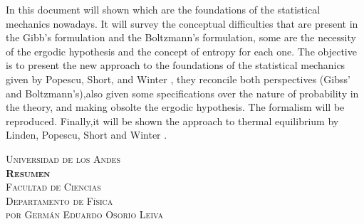\documentclass[11pt]{book}
\theoremstyle{definition}
\begin{document}
\vspace*{4em}
In this document will shown which are the foundations of the statistical mechanics nowadays. It will survey the conceptual difficulties that are present in the Gibb's formulation and the Boltzmann's formulation, some are the necessity of the ergodic hypothesis and the concept of entropy for each one. The objective is to present the new approach to the foundations of the statistical mechanics given by Popescu, Short, and Winter \cite{Popescu2006}, they reconcile both perspectives (Gibss' and Boltzmann's),also given some specifications over the nature of probability in the theory, and making obsolte the ergodic hypothesis. The formalism will be reproduced. Finally,it will be shown the approach to thermal equilibrium by Linden, Popescu, Short and Winter \cite{LindenPaper}.



\newpage

\begin{center}
\vspace*{5em}
\textsc{\normalsize Universidad de los Andes}\\[1em]

\textsc{\large \textbf{Resumen}}\\[1em]

\textsc{\normalsize Facultad de Ciencias}\\[1em]

\textsc{\normalsize Departamento de Física}\\[1em]

\textsc{\small por Germán Eduardo Osorio Leiva}
\end{center}

\vspace*{4em}
\end{document}
